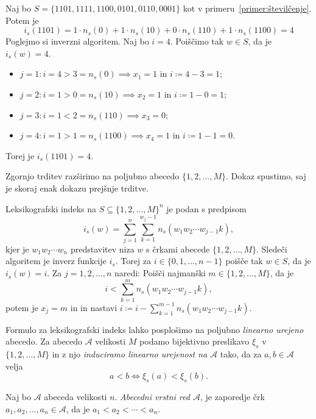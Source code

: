 \documentclass[fin1, tisk]{fmfdelo}
\newcommand{\A}{\mathcal{A}}
\theoremstyle{definition}
\begin{document}
\begin{primer}
    Naj bo $S = \{ 1101, 1111, 1100, 0101, 0110, 0001 \}$ kot v 
    primeru~\ref{primer:številčenje}. Potem je 
    \[
        i_s(1101) = 1 \cdot n_s(0) + 1 \cdot n_s(10) + 0 \cdot n_s(110) + 1 \cdot n_s(1100) = 4
    \]
    Poglejmo si inverzni algoritem. Naj bo $i = 4$. Poiščimo tak $w \in S$, da je $i_s(w) = 4$.
    \begin{itemize}
        \item $j=1 \colon i = 4 > 3 = n_s(0) \implies x_1 = 1$ in $i \coloneq 4 - 3 = 1$;
        \item $j=2 \colon i = 1 > 0 = n_s(10) \implies x_2 = 1$ in $i \coloneq 1 - 0 = 1$;
        \item $j=3 \colon i = 1 < 2 = n_s(110) \implies x_3 = 0$;
        \item $j=4 \colon i = 1 > 1 = n_s(1100) \implies x_4 = 1$ in $i \coloneq 1 - 1 = 0$.
    \end{itemize}
    Torej je $i_s(1101) = 4$.
\end{primer}

Zgornjo trditev razširimo na poljubno abecedo $\{ 1,2, \ldots, M\}$. Dokaz spustimo, saj je skoraj
enak dokazu prejšnje trditve.

\begin{trditev}
    Leksikografski indeks na $S \subseteq \{ 1,2, \ldots, M\}^n$ je 
    podan s predpisom
    \[
        i_s(w) = \sum_{j=1}^{n} \sum_{k=1}^{w_j-1} n_s(w_1w_2 \cdots w_{j-1}k),
    \]
    kjer je $w_1w_2 \cdots w_n$ predstavitev niza $w$ s črkami abecede $\{ 1,2, \ldots, M\}$.
    Sledeči algoritem je inverz funkcije $i_s$. Torej za $i \in \{ 0, 1, \ldots, n - 1 \}$ 
    poišče tak $w \in S$, da je $i_s(w) = i$. Za $j = 1,2, \ldots, n$ naredi: Poišči najmanški 
    $m \in \{ 1,2, \ldots, M\}$, da je 
    \[
        i < \sum_{k=1}^m n_s(w_1w_2 \cdots w_{j-1}k),
    \]
    potem je $x_j = m$ in in nastavi $i \coloneq i - \sum_{k=1}^{m-1} n_s(w_1w_2 \cdots w_{j-1}k)$.
\end{trditev} 

Formulo za leksikografski indeks lahko posplošimo na poljubno \emph{linearno urejeno} abecedo.
Za abecedo $\A$ velikosti $M$ podamo bijektivno preslikavo $\xi_s$ v 
$\{ 1,2, \ldots, M\}$ in z njo \emph{induciramo linearno urejenost na $\A$} tako,
da za $a,b \in \A$ velja
\[
    a < b \iff \xi_s(a) < \xi_s(b).
\]

\begin{definicija}
    Naj bo $\A$ abeceda velikosti $n$. \emph{Abecedni vrstni red $\A$}, je 
    zaporedje črk $a_1, a_2, \ldots, a_n \in \A$, da je $a_1 < a_2 < \cdots < a_n$.
\end{definicija}
\end{document}
